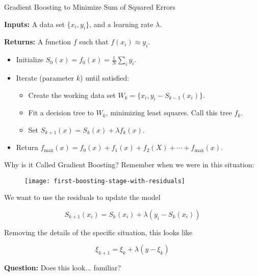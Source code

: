 \begin{frame}{Gradient Boosting to Minimize Sum of Squared Errors}

\textbf{Inputs:} A data set $\{ x_i, y_i \}$, and a learning rate $\lambda$.

\textbf{Returns:} A function $f$ such that $f(x_i) \approx y_i$.

\begin{itemize}
  \item Initialize $S_0(x) = f_0(x) = \frac{1}{N} \sum_i y_i$.
  \item Iterate (parameter $k$) until satisfied: \begin{itemize}
    \item Create the working data set $W_k = \{ x_i, y_i - S_{k-1}(x_i) \}$.
    \item Fit a decision tree to $W_k$, minimizing least squares.  Call this tree $f_k$.
    \item Set $S_{k+1}(x) = S_{k}(x) + \lambda f_{k}(x)$. 
  \end{itemize}
  \item Return $f_{\text{max}}(x) = f_0(x) + f_1(x) + f_2(X) + \cdots + f_{\text{max}}(x)$.
\end{itemize}

\end{frame}
%

\begin{frame}{Why is it Called Gradient Boosting?}
Remember when we were in this situation:

  \begin{figure}
    \texttt{[image: first-boosting-stage-with-residuals]}
  \end{figure}
  
We want to use the residuals to update the model

$$ S_{k+1}(x_i) = S_{k}(x_i) + \lambda (y_i - S_{k}(x_i)) $$

\end{frame}
%

\begin{frame}
Removing the details of the specific situation, this looks like

$$ \xi_{k+1} = \xi_k + \lambda (y - \xi_k) $$

\textbf{Question:} Does this look... familiar?
\end{frame}
%

